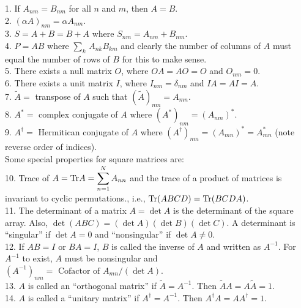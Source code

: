 1. If $A_{nm} = B_{nm}$ for all $n$ and $m$, then $A = B$.\\
2. $(\alpha A)_{nm} = \alpha A_{nm}$.\\
3. $S = A+B = B+A$ where $S_{nm} = A_{nm} + B_{nm}$.\\
4. $P = AB$ where $\displaystyle \sum_{k}\, A_{nk} B_{km}$ and clearly the number of columns of $A$ must equal the number of rows of $B$ for this to make sense. \\
5. There exists a null matrix $O$, where $OA = AO = O$ and $O_{nm} = 0$.\\
6. There exists a unit matrix $I$, where $I_{nm} = \delta_{nm}$ and $IA = AI = A$.\\
7. $\tilde{A} =$ transpose of $A$ such that $(\tilde{A})_{nm} = A_{mn}$.\\
8. $A^* =$ complex conjugate of $A$ where $(A^*)_{nm} = (A_{nm})^*$.\\
9. $A^\dagger =$ Hermitican conjugate of $A$ where $(A^\dagger)_{nm} = (A_{mn})^* = A^*_{mn}$ (note reverse order of indices). \\
Some  special properties for square matrices are:\\
10. Trace of $\displaystyle A = {\rm Tr} A = \sum_{n=1}^N A_{nn}$ and the trace of a product of matrices is invariant to cyclic permutations., i.e., ${\rm Tr}(ABCD) = {\rm Tr}(BCDA)$.\\
11. The determinant of a matrix $A = \det A$ is the determinant of the square array. Also, $\det(ABC) = (\det A)(\det B) (\det C)$.
A determinant is ``singular'' if $\det A = 0$ and ``nonsingular'' if $\det A \ne 0$.\\
12. If $AB=I$ or $BA = I$, $B$ is called the inverse of $A$ and written as $A^{-1}$. For $A^{-1}$ to exist, $A$ must be nonsingular and $(A ^{-1})_{nm} = \mbox{ Cofactor of } A_{mn}/(\det A)$.\\
13. $A$ is called an ``orthogonal matrix'' if $\tilde{A} = A^{-1}$. Then $\tilde{A}A = A\tilde{A} = 1$.\\
14. $A$ is called a ``unitary matrix'' if $A^\dagger = A^{-1}$. Then $A^\dagger A = A A^\dagger = 1$.

